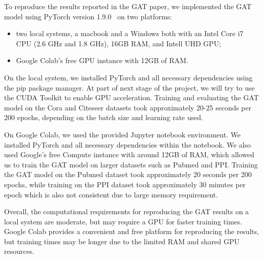 To reproduce the results reported in the GAT paper, we implemented the GAT model using PyTorch version 1.9.0~\cite{paszke2019pytorch} on two platforms:
\begin{itemize}
    \item two local systems, a macbook and a Windows both with an Intel Core i7 CPU (2.6 GHz and 1.8 GHz), 16GB RAM,
    and Intell UHD GPU;
    \item Google Colab's free GPU instance with 12GB of RAM\@.
\end{itemize}

On the local system, we installed PyTorch and all necessary dependencies using the pip package manager.
At part of next stage of the project, we will try to use the CUDA Toolkit to enable GPU acceleration.
Training and evaluating the GAT model on the Cora and Citeseer datasets took approximately 20-25 seconds per 200
epochs, depending on the batch size and learning rate used.

On Google Colab, we used the provided Jupyter notebook environment.
We installed PyTorch and all necessary dependencies within the notebook.
We also used Google's free Compute instance with around 12GB of RAM, which allowed us to train the GAT model on larger
datasets such as Pubmed and PPI\@.
Training the GAT model on the Pubmed dataset took approximately 20 seconds per 200 epochs, while training on the PPI
dataset took approximately 30 minutes per epoch which is also not consistent due to large memory requirement.

Overall, the computational requirements for reproducing the GAT results on a local system are moderate, but may require a GPU for faster training times.
Google Colab provides a convenient and free platform for reproducing the results, but training times may be longer due to the limited RAM and shared GPU resources.
